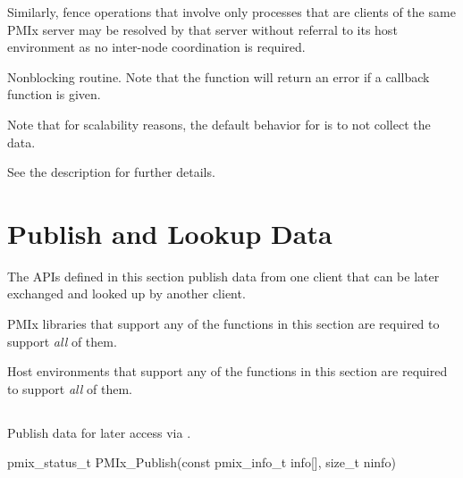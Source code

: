 Similarly, fence operations that involve only processes that are clients of the same \ac{PMIx} server may be resolved by that server without referral to its host environment as no inter-node coordination is required.
\adviceimplend

\descr

Nonblocking  routine.
Note that the function will return an error if a  callback function is given.

Note that for scalability reasons, the default behavior for  is to not collect the data.

See the  description for further details.

\section{Publish and Lookup Data}
\label{chap:api_kv_mgmt:publish}

The APIs defined in this section publish data from one client that can be later exchanged and looked up by another client.

\adviceimplstart
\ac{PMIx} libraries that support any of the functions in this section are required to support \textit{all} of them.
\adviceimplend

\advicermstart
Host environments that support any of the functions in this section are required to support \textit{all} of them.
\advicermend

\subsection{}

\summary

Publish data for later access via .

\format

\cspecificstart
\begin{codepar}
pmix_status_t
PMIx_Publish(const pmix_info_t info[], size_t ninfo)
\end{codepar}
\cspecificend

\begin{arglist}
\end{arglist}

